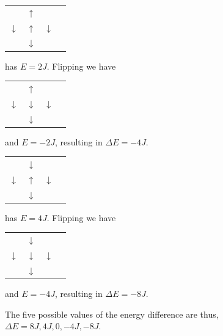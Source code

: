 \documentclass[english,notitlepage,reprint,nofootinbib]{revtex4-1}  %
\begin{document}
\begin{table}[H]
    \begin{tabular}{llll}
       & $\uparrow$ &    \\
    $\downarrow$ & $\uparrow$ & $\downarrow$ \\
       & $\downarrow$ &  
    \end{tabular}
    has $E = 2J$. Flipping we have 
    \begin{tabular}{llll}
        & $\uparrow$ &    \\
     $\downarrow$ & $\downarrow$ & $\downarrow$ \\
        & $\downarrow$ &  
     \end{tabular}
     and $E = -2J$, resulting in $\Delta E = -4J$.
\end{table}

\begin{table}[H]
    \begin{tabular}{llll}
       & $\downarrow$ &    \\
    $\downarrow$ & $\uparrow$ & $\downarrow$ \\
       & $\downarrow$ &  
    \end{tabular}
    has $E = 4J$. Flipping we have 
    \begin{tabular}{llll}
        & $\downarrow$ &    \\
     $\downarrow$ & $\downarrow$ & $\downarrow$ \\
        & $\downarrow$ &  
     \end{tabular}
     and $E = -4J$, resulting in $\Delta E = -8J$.
\end{table}
The five possible values of the energy difference are thus, $\Delta E = 8J, 4J, 0, -4J, -8J$.

\newpage
\end{document}
